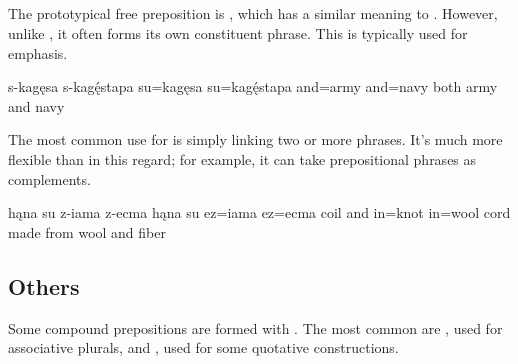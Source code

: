 \subsection{}
The prototypical free preposition is , which has a similar meaning to . However, unlike , it often forms its own constituent phrase. This is typically used for emphasis.

\begin{example}
    \script s-kagęsa s-kagę́stapa
    \bits su=kagęsa su=kagę́stapa
    \gloss and=army and=navy
    \tr both army and navy
\end{example}

The most common use for  is simply linking two or more phrases. It's much more flexible than  in this regard; for example, it can take prepositional phrases as complements.

\begin{example}
    \script hąna su z-iama z-ecma
    \bits hąna su ez=iama ez=ecma
    \gloss coil and in=knot in=wool
    \tr cord made from wool and fiber
\end{example}

\subsection{Others}
Some compound prepositions are formed with . The most common are , used for associative plurals, and , used for some quotative constructions.